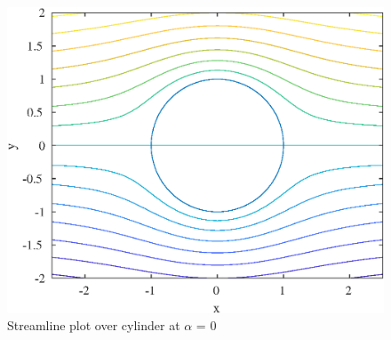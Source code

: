 
  
\begin{figure}[H]
\centering
\includegraphics[scale=0.80]{graphs/e4g1.eps}
\caption{Streamline plot over cylinder at $\alpha$ = 0}
\label{e4g1}
\end{figure}

\pagebreak